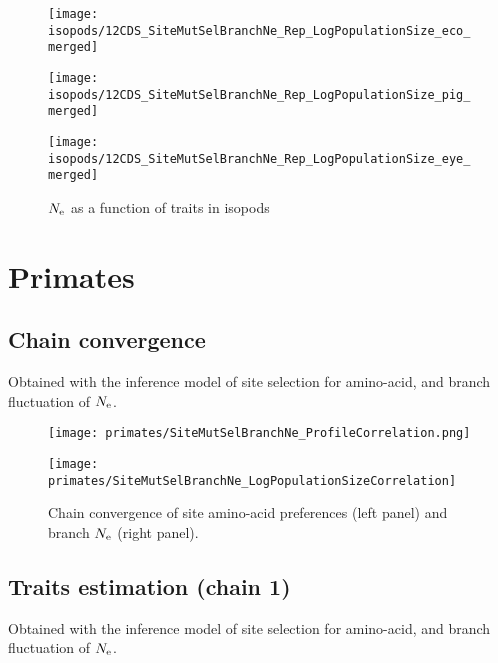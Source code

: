 \begin{figure}[H]
    \centering
    \begin{minipage}{0.32\linewidth}
        \texttt{[image: isopods/12CDS\_SiteMutSelBranchNe\_Rep\_LogPopulationSize\_eco\_merged]}
    \end{minipage} \hfill
    \begin{minipage}{0.32\linewidth}
        \texttt{[image: isopods/12CDS\_SiteMutSelBranchNe\_Rep\_LogPopulationSize\_pig\_merged]}
    \end{minipage} \hfill
    \begin{minipage}{0.32\linewidth}
        \texttt{[image: isopods/12CDS\_SiteMutSelBranchNe\_Rep\_LogPopulationSize\_eye\_merged]}
    \end{minipage}
    \caption[$\Ne$ as a function of traits in isopods]{$\Ne$ as a function of traits in isopods}
\end{figure}


\section{Primates}

\subsection{Chain convergence}
Obtained with the inference model of site selection for amino-acid, and branch fluctuation of $\Ne$.

\begin{figure}[H]
    \centering
    \begin{minipage}{0.49\linewidth}
        \texttt{[image: primates/SiteMutSelBranchNe\_ProfileCorrelation.png]}
    \end{minipage} \hfill
    \begin{minipage}{0.49\linewidth}
        \texttt{[image: primates/SiteMutSelBranchNe\_LogPopulationSizeCorrelation]}
    \end{minipage}
    \caption[Chain convergence of site profiles and branche $\Ne$]{
    Chain convergence of site amino-acid preferences (left panel) and branch $\Ne$ (right panel).}
\end{figure}

\subsection{Traits estimation (chain 1)}
Obtained with the inference model of site selection for amino-acid, and branch fluctuation of $\Ne$.

